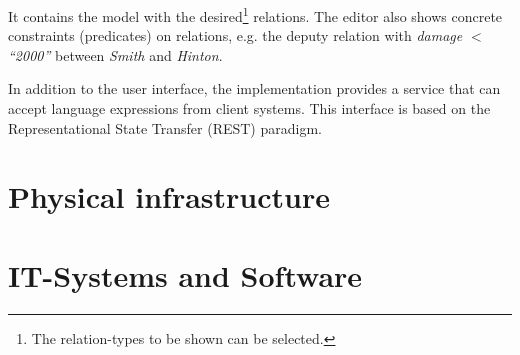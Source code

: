 It contains the model with the desired\footnote{The relation-types to be shown can be selected.} relations. The editor also shows concrete constraints (predicates) on relations, e.g. the deputy relation with \emph{damage $<$ ``2000''} between \emph{Smith} and \emph{Hinton}.


In addition to the user interface, the implementation provides a service that can accept language expressions from client systems. This interface is based on the Representational State Transfer (REST) paradigm.



\section{Physical infrastructure}

\section{IT-Systems and Software}

